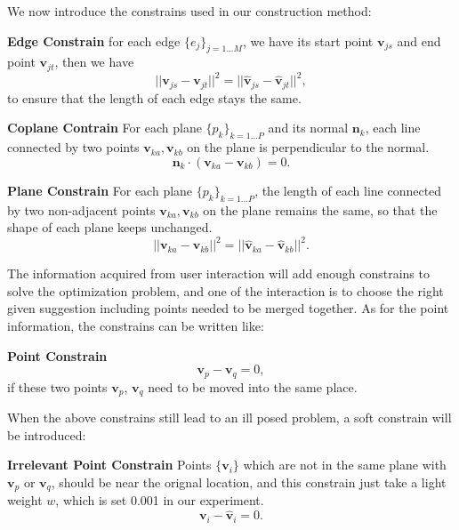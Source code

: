 \documentclass[submission]{gmp2018}
\begin{document}
We now introduce the constrains used in our construction method:

\noindent
\textbf{Edge Constrain} for each edge $\{e_j\}_{j=1...M}$, we have its start point $\mathbf{v}_{js}$ and end point $\mathbf{v}_{jt}$, then we have 
\begin{equation}
||\mathbf{v}_{js} - \mathbf{v}_{jt}||^2 = ||\mathbf{\hat{v}}_{js} - \mathbf{\hat{v}}_{jt}||^2,
\label{equ:edge}
\end{equation}
to ensure that the length of each edge stays the same.

\noindent
\textbf{Coplane Contrain} For each plane $\{p_k\}_{k=1 \dots P}$ and its normal $\mathbf{n}_k$, each line connected by two points $\mathbf{v}_{ka}, \mathbf{v}_{kb}$ on the plane is perpendicular to the normal.
\begin{equation}
\mathbf{n}_k \cdot (\mathbf{v}_{ka} - \mathbf{v}_{kb}) = 0.
\label{equ:coplane}
\end{equation}

\noindent
\textbf{Plane Constrain} For each plane $\{p_k\}_{k=1 \dots P}$, the length of each line connected by two non-adjacent points $\mathbf{v}_{ka}, \mathbf{v}_{kb}$ on the plane remains the same, so that the shape of each plane keeps unchanged.
\begin{equation}
||\mathbf{v}_{ka} - \mathbf{v}_{kb}||^2 = ||\hat{\mathbf{v}}_{ka} - \hat{\mathbf{v}}_{kb}||^2.
\label{equ:plane}
\end{equation}

The information acquired from user interaction will add enough constrains to solve the optimization problem, and one of the interaction is to choose the right given suggestion including points needed to be merged together. As for the point information, the constrains can be written like:

\noindent
\textbf{Point Constrain} 
\begin{equation}
\mathbf{v}_p - \mathbf{v}_q = 0,
\label{equ:point}
\end{equation}
if these two points $\mathbf{v}_p$, $\mathbf{v}_q$ need to be moved into the same place.

When the above constrains still lead to an ill posed problem, a soft constrain will be introduced:

\noindent
\textbf{Irrelevant Point Constrain} Points $\{\mathbf{v}_i\}$ which are not in the same plane with $\mathbf{v}_p$ or $\mathbf{v}_q$, should be near the orignal location, and this constrain just take a light weight $w$, which is set 0.001 in our experiment. 
\begin{equation}
\mathbf{v}_i - \mathbf{\hat{v}}_i = 0.
\label{equ:irrelevant}
\end{equation}
\end{document}
